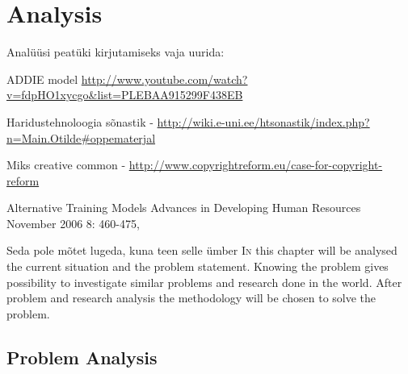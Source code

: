 \chapter{Analysis}
\label{analysis}


{\color{red} Analüüsi peatüki kirjutamiseks vaja uurida:}

ADDIE model \url{http://www.youtube.com/watch?v=fdpHO1xycgo&list=PLEBAA915299F438EB}


Haridustehnoloogia sõnastik - \url{http://wiki.e-uni.ee/htsonastik/index.php?n=Main.Otilde#oppematerjal}

Miks creative common - \url{http://www.copyrightreform.eu/case-for-copyright-reform}

Alternative Training Models
Advances in Developing Human Resources November 2006 8: 460-475,


{\color{red} Seda pole mõtet lugeda, kuna teen selle ümber }
\lettrine[lraise=0.1, nindent=0em, slope=-.5em]{\color{Violet}I}{n} this chapter will be analysed the current situation and the problem statement. Knowing the problem gives possibility to investigate similar problems and research done in the world. After problem and research analysis the methodology will be chosen to solve the problem.




\section{Problem Analysis}
\label{Problem Analysis}

